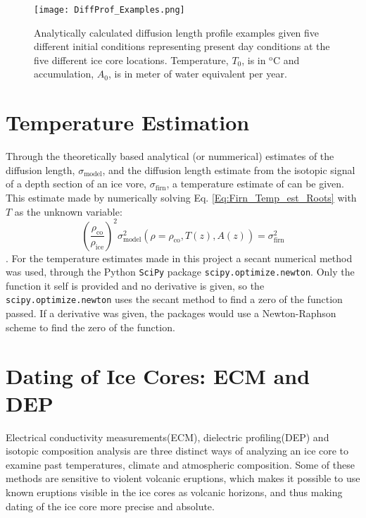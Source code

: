 \documentclass[../../CompleteThesis2/Complete_2ndDraft]{subfiles}
\begin{document}
\begin{figure}
	\centering
	\texttt{[image: DiffProf\_Examples.png]}
	\caption{Analytically calculated diffusion length profile examples given five different initial conditions representing present day conditions at the five different ice core locations. Temperature, $T_0$, is in $^{\text{o}}$C and accumulation, $A_0$, is in meter of water equivalent per year.}
	\label{Fig:DiffProf_Examples}
\end{figure}


\section[Temperature Estimation]{Temperature Estimation}
\label{Sec:Ice_TempEstimation}
Through the theoretically based analytical (or nummerical) estimates of the diffusion length, $\sigma_{\text{model}}$, and the diffusion length estimate from the isotopic signal of a depth section of an ice vore, $\sigma_{\text{firn}}$, a temperature estimate of can be given. This estimate made by numerically solving Eq. \ref{Eq:Firn_Temp_est_Roots} with $T$ as the unknown variable:
\begin{equation}
	\left(\frac{\rho_{\text{co}}}{\rho_{\text{ice}}}\right)^2 \sigma_{\text{model}}^2(\rho=\rho_{\text{co}}, T(z), A(z)) = \sigma^2_{\text{firn}}
	\label{Eq:Firn_Temp_est_Roots2}
\end{equation}. For the temperature estimates made in this project a secant numerical method\cite{Press2007} was used, through the Python \lstinline[language=Python]|SciPy| package \lstinline[language=Python]|scipy.optimize.newton|. Only the function it self is provided and no derivative is given, so the \lstinline[language=Python]|scipy.optimize.newton| uses the secant method to find a zero of the function passed. If a derivative was given, the packages would use a Newton-Raphson\cite{Press2007} scheme to find the zero of the function.








\section[ECM and DEP][ECM and DEP]{Dating of Ice Cores: ECM and DEP}
\label{Sec:Ice_ECMandDEP}
Electrical conductivity measurements(ECM), dielectric profiling(DEP) and isotopic composition analysis are three distinct ways of analyzing an ice core to examine past temperatures, climate and atmospheric composition. Some of these methods are sensitive to violent volcanic eruptions, which makes it possible to use known eruptions visible in the ice cores as volcanic horizons, and thus making dating of the ice core more precise and absolute.
\end{document}
